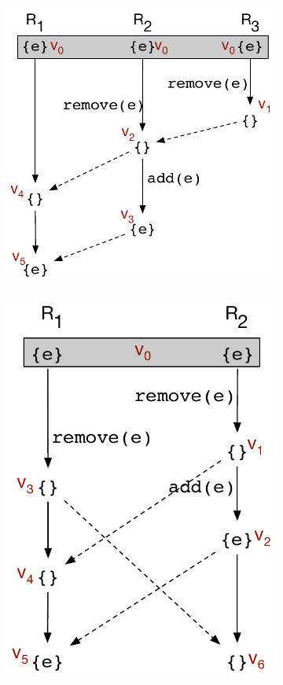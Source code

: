 \begin{figure}[ht]
  \centering
  \begin{subfigure}[t]{0.55\columnwidth}
    \includegraphics[scale=0.35]{Figures/mrdt-execs-1}
    \caption{}
    \label{fig:mrdt-exec-1}
  \end{subfigure}
  \begin{subfigure}[t]{0.44\columnwidth}
    \includegraphics[scale=0.35]{Figures/mrdt-execs-2}

\end{subfigure}
\end{figure}
